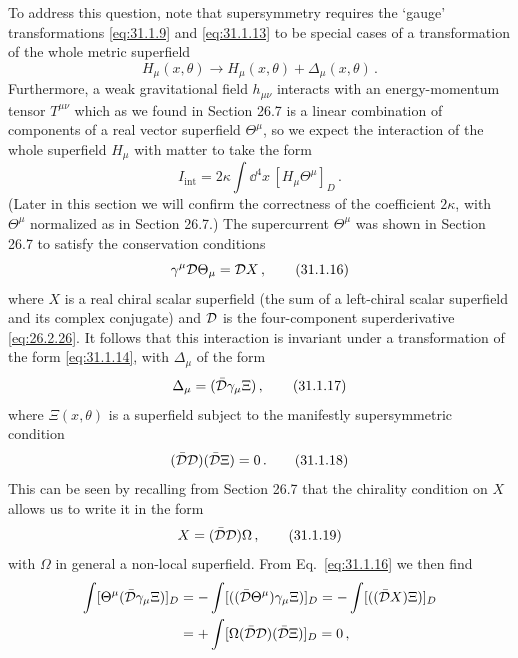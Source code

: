 To address this question, note that supersymmetry requires the `gauge'
transformations \eqref{eq:31.1.9} and \eqref{eq:31.1.13} to be special cases
of a transformation of the whole metric superfield
\begin{equation}
  H_\mu(x,\theta)\to H_\mu(x,\theta)+\Delta_\mu(x,\theta)\,.
  \tag{31.1.14}\label{eq:31.1.14}
\end{equation}
Furthermore, a weak gravitational field \(h_{\mu\nu}\) interacts with an
energy-momentum tensor \(T^{\mu\nu}\) which as we found in Section 26.7 is a
linear combination of components of a real vector superfield \(\Theta^\mu\),
so we expect the interaction of the whole superfield \(H_\mu\) with matter to
take the form
\begin{equation}
  I_{\mathrm{int}}
  =2\kappa\int \dd^4x\,[H_\mu\Theta^\mu]_D\,.
  \tag{31.1.15}\label{eq:31.1.15}
\end{equation}
(Later in this section we will confirm the correctness of the coefficient
\(2\kappa\), with \(\Theta^\mu\) normalized as in Section 26.7.) The
supercurrent \(\Theta^\mu\) was shown in Section 26.7 to satisfy the
conservation conditions
\begin{equation}
  \gamma^\mu\mathcal{D}\Theta_\mu=\mathcal{D} X\,,
  \tag{31.1.16}\label{eq:31.1.16}
\end{equation}
where \(X\) is a real chiral scalar superfield (the sum of a left-chiral
scalar superfield and its complex conjugate) and \(\mathcal{D}\) is the
four-component superderivative \eqref{eq:26.2.26}. It follows that this
interaction is invariant under a transformation of the form
\eqref{eq:31.1.14}, with \(\Delta_\mu\) of the form
\begin{equation}
  \Delta_\mu=(\bar{\mathcal{D}}\gamma_\mu\Xi)\,,
  \tag{31.1.17}\label{eq:31.1.17}
\end{equation}
where \(\Xi(x,\theta)\) is a superfield subject to the manifestly
supersymmetric condition
\begin{equation}
  (\bar{\mathcal{D}}\mathcal{D})(\bar{\mathcal{D}}\Xi)=0\,.
  \tag{31.1.18}\label{eq:31.1.18}
\end{equation}
This can be seen by recalling from Section 26.7 that the chirality condition
on \(X\) allows us to write it in the form
\begin{equation}
  X=(\bar{\mathcal{D}}\mathcal{D})\Omega\,,
  \tag{31.1.19}\label{eq:31.1.19}
\end{equation}
with \(\Omega\) in general a non-local superfield. From
Eq.~\eqref{eq:31.1.16} we then find
\[
  \begin{aligned}
  \int[\Theta^\mu(\bar{\mathcal{D}}\gamma_\mu\Xi)]_D
  &=-\int[((\bar{\mathcal{D}}\Theta^\mu)\gamma_\mu\Xi)]_D
   =-\int[((\bar{\mathcal{D}}X)\Xi)]_D
  \\
  &=+\int[\Omega(\bar{\mathcal{D}}\mathcal{D})(\bar{\mathcal{D}}\Xi)]_D=0\,,
  \end{aligned}
\]
